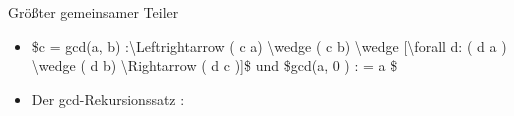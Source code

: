 \documentclass[a4paper]{article}
\begin{document}
\begin{multicols}{3}

    Größter gemeinsamer Teiler

    \begin{itemize}
        \item
              \$c = gcd(a, b) :\textbackslash Leftrightarrow ( c \textbar{} a)
              \textbackslash wedge ( c \textbar{} b) \textbackslash wedge
              {[}\textbackslash forall d: ( d \textbar{} a ) \textbackslash wedge (
              d \textbar{} b) \textbackslash Rightarrow ( d \textbar{} c ){]}\$ und
              \$gcd(a, 0 ) : = \textbar{} a \textbar\$
        \item
              Der gcd-Rekursionssatz :


\end{itemize}
\end{multicols}
\end{document}
